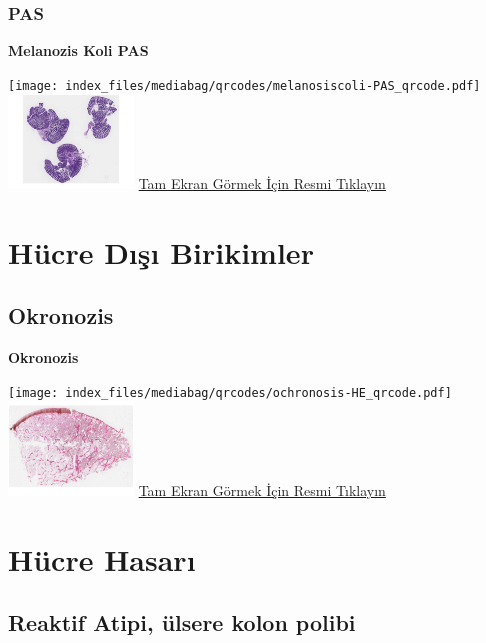 \documentclass[
  letterpaper,
  DIV=11,
  numbers=noendperiod]{scrreprt}
\begin{document}
\subsection{PAS}\label{pas-1}

\textbf{Melanozis Koli PAS}

\texttt{[image: index\_files/mediabag/qrcodes/melanosiscoli-PAS\_qrcode.pdf]}
\href{https://images.patolojiatlasi.com/melanosiscoli/PAS.html}{\includegraphics[width=0.25\textwidth,height=\textheight]{./screenshots/thumbnail_melanosiscoli-PAS.png}}
\href{https://images.patolojiatlasi.com/melanosiscoli/PAS.html}{Tam
Ekran Görmek İçin Resmi Tıklayın}

\chapter{Hücre Dışı Birikimler}\label{sec-hucre-disi-birikimler}

\section{Okronozis}\label{sec-okronozis}

\textbf{Okronozis}

\texttt{[image: index\_files/mediabag/qrcodes/ochronosis-HE\_qrcode.pdf]}
\href{https://images.patolojiatlasi.com/ochronosis/HE.html}{\includegraphics[width=0.25\textwidth,height=\textheight]{./screenshots/thumbnail_ochronosis.png}}
\href{https://images.patolojiatlasi.com/ochronosis/HE.html}{Tam Ekran
Görmek İçin Resmi Tıklayın}

\chapter{Hücre Hasarı}\label{sec-hucre-hasari}

\section{Reaktif Atipi, ülsere kolon polibi}\label{sec-reaktif-atipi}
\end{document}
